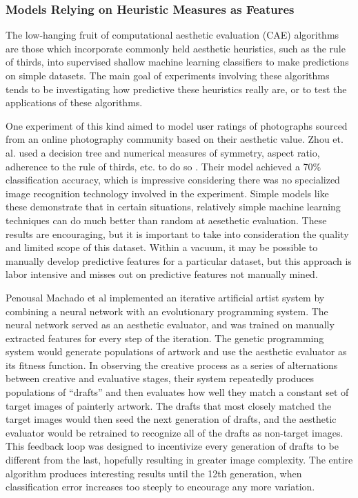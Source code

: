 \documentclass[midd]{thesis}
\begin{document}
\subsubsection{Models Relying on Heuristic Measures as Features}


The low-hanging fruit of computational aesthetic evaluation (CAE) algorithms are those which incorporate commonly held aesthetic heuristics, such as the rule of thirds, into supervised shallow machine learning classifiers to make predictions on simple datasets. The main goal of experiments involving these algorithms tends to be investigating how predictive these heuristics really are, or to test the applications of these algorithms.

One experiment of this kind aimed to model user ratings of photographs sourced from an online photography community based on their aesthetic value. Zhou et. al. used a decision tree and numerical measures of symmetry, aspect ratio, adherence to the rule of thirds, etc. to do so \cite{zhou2014computational}. Their model achieved a 70\% classification accuracy, which is impressive considering there was no specialized image recognition technology involved in the experiment. Simple models like these demonstrate that in certain situations, relatively simple machine learning techniques can do much better than random at aesethetic evaluation. These results are encouraging, but it is important to take into consideration the quality and limited scope of this dataset. Within a vacuum, it may be possible to manually develop predictive features for a particular dataset, but this approach is labor intensive and misses out on predictive features not manually mined.

Penousal Machado et al \cite{machado2008experiments} implemented an iterative artificial artist system by combining a neural network with an evolutionary programming system. The neural network served as an aesthetic evaluator, and was trained on manually extracted features for every step of the iteration. The genetic programming system would generate populations of artwork and use the aesthetic evaluator as its fitness function. In observing the creative process as a series of alternations between creative and evaluative stages, their system repeatedly produces populations of ``drafts'' and then evaluates how well they match a constant set of target images of painterly artwork. The drafts that most closely matched the target images would then seed the next generation of drafts, and the aesthetic evaluator would be retrained to recognize all of the drafts as non-target images. This feedback loop was designed to incentivize every generation of drafts to be different from the last, hopefully resulting in greater image complexity. The entire algorithm produces interesting results until the 12th generation, when classification error increases too steeply to encourage any more variation.
\end{document}
